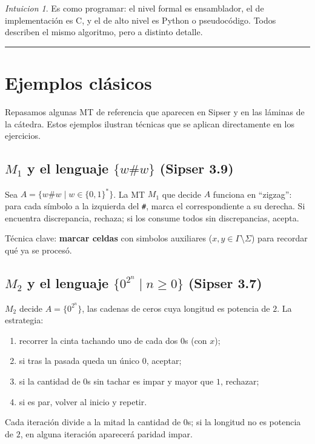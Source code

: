 \documentclass[11pt,a4paper]{article}
\theoremstyle{plain}
\theoremstyle{definition}
\theoremstyle{remark}
\newtheorem*{intuicion}{Intuicion}
\begin{document}
\begin{intuicion}
Es como programar: el nivel formal es ensamblador, el de implementaci\'on es
C, y el de alto nivel es Python o pseudoc\'odigo. Todos describen el mismo
algoritmo, pero a distinto detalle.
\end{intuicion}

\bigskip\hrule\bigskip

\section{Ejemplos cl\'asicos}
\label{sec:ejemplos}

Repasamos algunas MT de referencia que aparecen en Sipser y en las l\'aminas
de la c\'atedra. Estos ejemplos ilustran t\'ecnicas que se aplican
directamente en los ejercicios.

\subsection{$M_1$ y el lenguaje $\{w\#w\}$ (Sipser 3.9)}

Sea $A=\{w\#w \mid w\in\{0,1\}^*\}$. La MT $M_1$ que decide $A$ funciona en
``zigzag'': para cada s\'imbolo a la izquierda del \texttt{\#}, marca el
correspondiente a su derecha. Si encuentra discrepancia, rechaza; si los
consume todos sin discrepancias, acepta.

T\'ecnica clave: \textbf{marcar celdas} con simbolos auxiliares
($x,y\in\Gamma\setminus\Sigma$) para recordar qu\'e ya se proces\'o.

\subsection{$M_2$ y el lenguaje $\{0^{2^n}\mid n\ge 0\}$ (Sipser 3.7)}

$M_2$ decide $A=\{0^{2^n}\}$, las cadenas de ceros cuya longitud es
potencia de $2$. La estrategia:
\begin{enumerate}
  \item recorrer la cinta tachando uno de cada dos $0$s (con $x$);
  \item si tras la pasada queda un \'unico $0$, aceptar;
  \item si la cantidad de $0$s sin tachar es impar y mayor que $1$, rechazar;
  \item si es par, volver al inicio y repetir.
\end{enumerate}
Cada iteraci\'on divide a la mitad la cantidad de $0$s; si la longitud no
es potencia de $2$, en alguna iteraci\'on aparecer\'a paridad impar.
\end{document}
